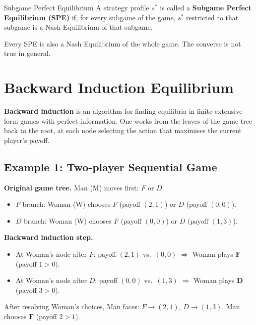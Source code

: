\documentclass[12pt, a4paper]{article}
\begin{document}
\begin{defbox}{Subgame Perfect Equilibrium}
  A strategy profile $s^*$ is called a \textbf{Subgame Perfect Equilibrium (SPE)} if, for every subgame of the game, $s^*$ restricted to that subgame is a Nash Equilibrium of that subgame.
\end{defbox}

\begin{notebox}
  Every SPE is also a Nash Equilibrium of the whole game. The converse is not true in general.
\end{notebox}

\section{Backward Induction Equilibrium}

\textbf{Backward induction} is an algorithm for finding equilibria in finite extensive form games with perfect information. One works from the leaves of the game tree back to the root, at each node selecting the action that maximises the current player's payoff.

\subsection{Example 1: Two-player Sequential Game}

\noindent\textbf{Original game tree.} Man (M) moves first: $F$ or $D$.
\begin{itemize}
  \item $F$ branch: Woman (W) chooses $F$ (payoff $(2,1)$) or $D$ (payoff $(0,0)$).
  \item $D$ branch: Woman (W) chooses $F$ (payoff $(0,0)$) or $D$ (payoff $(1,3)$).
\end{itemize}

\noindent\textbf{Backward induction step.}
\begin{itemize}
  \item At Woman's node after $F$: payoff $(2,1)$ vs.\ $(0,0)$ $\Rightarrow$ Woman plays $\mathbf{F}$ (payoff $1 > 0$).
  \item At Woman's node after $D$: payoff $(0,0)$ vs.\ $(1,3)$ $\Rightarrow$ Woman plays $\mathbf{D}$ (payoff $3 > 0$).
\end{itemize}

\noindent After resolving Woman's choices, Man faces: $F \to (2,1)$, $D \to (1,3)$.
Man chooses $\mathbf{F}$ (payoff $2 > 1$).
\end{document}
